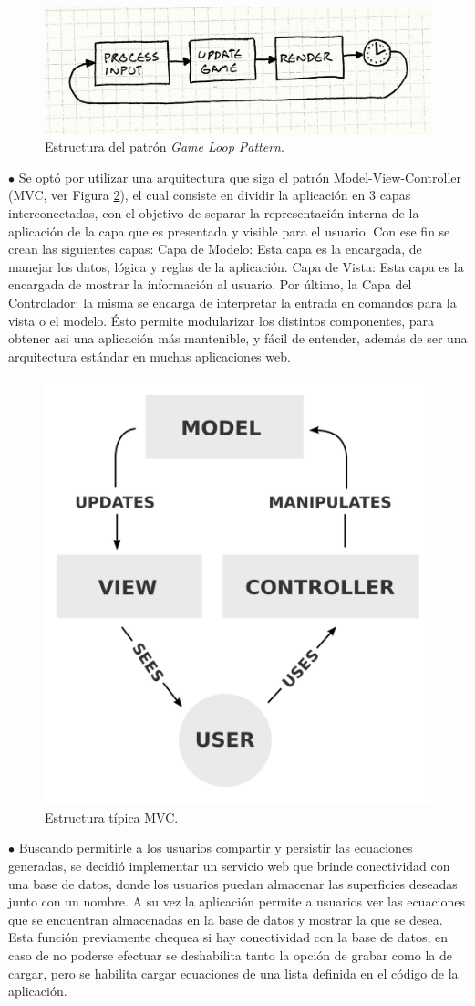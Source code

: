 \documentclass[12pt]{article}
\begin{document}
\begin{figure}[h]
\includegraphics[width =0.8\linewidth, center]{gameloop.png}
\caption{Estructura del patrón \textit{Game Loop Pattern}\cite{patterns}.}
\label{glp}
\end{figure}

$\bullet$ Se optó por utilizar una arquitectura que siga el patrón Model-View-Controller (MVC, ver Figura \ref{mvc}), el cual consiste en dividir la aplicación en 3 capas interconectadas, con el objetivo de separar la representación interna de la aplicación de la capa que es presentada y visible para el usuario. Con ese fin se crean las siguientes capas: Capa de Modelo: Esta capa es la encargada, de manejar los datos, lógica y reglas de la aplicación. Capa de Vista: Esta capa es la encargada de mostrar la información al usuario. Por último, la Capa del Controlador: la misma se encarga de interpretar la entrada en comandos para la vista o el modelo.  Ésto permite modularizar los distintos componentes, para obtener asi una aplicación más mantenible, y fácil de entender, además de ser una arquitectura estándar en muchas aplicaciones web.


\begin{figure}[h!]
\includegraphics[width =0.5\linewidth, center]{mvc.png}
\caption{Estructura típica MVC.}
\label{mvc}
\end{figure}
$\bullet$ Buscando permitirle a los usuarios compartir y persistir las ecuaciones generadas, se decidió implementar un servicio web que brinde conectividad con una base de datos, donde los usuarios puedan almacenar las superficies deseadas junto con un nombre. A su vez la aplicación permite a usuarios ver las ecuaciones que se encuentran almacenadas en la base de datos y mostrar la que se desea. Esta función previamente chequea si hay conectividad con la base de datos, en caso de no poderse efectuar se deshabilita tanto la opción de grabar como la de cargar, pero se habilita cargar ecuaciones de una lista definida en el código de la aplicación. 
\end{document}
